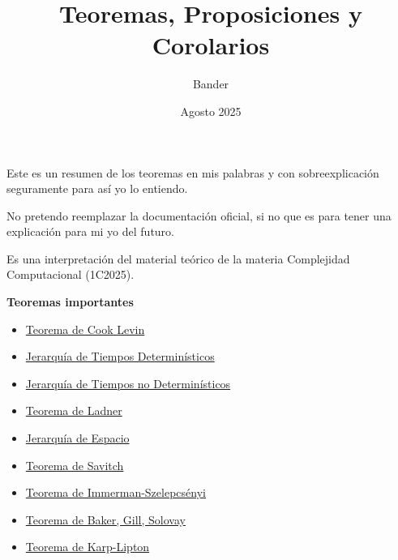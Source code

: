 \documentclass{article}
\title{Teoremas, Proposiciones y Corolarios}
\author{Bander}
\date{Agosto 2025}
\begin{document}
\maketitle

\begin{flushleft}
  Este es un resumen de los teoremas en mis palabras y con sobreexplicación seguramente para así 
  yo lo entiendo. 

  No pretendo reemplazar la documentación oficial, si no que es para tener una explicación para 
  mi yo del futuro.

  Es una interpretación del material teórico de la materia Complejidad Computacional (1C2025).
\end{flushleft}

\begin{flushleft}
  \LARGE \textbf{Teoremas importantes}
\end{flushleft}
\begin{itemize}
  \item \hyperlink{cooklevin}{\textcolor{Bittersweet}{Teorema de Cook Levin}}
  \item \hyperlink{jerTdet}{\textcolor{Bittersweet}{Jerarquía de Tiempos Determinísticos}}
  \item \hyperlink{jerTnodet}{\textcolor{Bittersweet}{Jerarquía de Tiempos no Determinísticos}}
  \item \hyperlink{ladner}{\textcolor{Bittersweet}{Teorema de Ladner}}
  \item \hyperlink{jerEspacio}{\textcolor{Bittersweet}{Jerarquía de Espacio}}
  \item \hyperlink{savitch}{\textcolor{Bittersweet}{Teorema de Savitch}}
  \item \hyperlink{immerman}{\textcolor{Bittersweet}{Teorema de Immerman-Szelepcsényi}}
  \item \hyperlink{baker}{\textcolor{Bittersweet}{Teorema de Baker, Gill, Solovay}}
  \item \hyperlink{karpLipton}{\textcolor{Bittersweet}{Teorema de Karp-Lipton}}
\end{itemize}

\pagebreak
\end{document}
